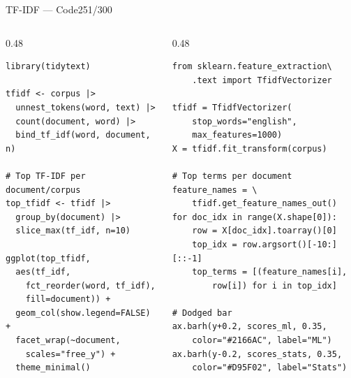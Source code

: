 \documentclass[10pt]{beamer}
\newcommand{\smark}[1]{\hfill{\scriptsize\color{codegray}#1}}
\begin{document}
\begin{frame}[fragile]{TF-IDF --- Code}\smark{251/300}
\begin{columns}[T]
\begin{column}{0.48\textwidth}
\begin{lstlisting}[style=Rstyle]
library(tidytext)

tfidf <- corpus |>
  unnest_tokens(word, text) |>
  count(document, word) |>
  bind_tf_idf(word, document, n)

# Top TF-IDF per document/corpus
top_tfidf <- tfidf |>
  group_by(document) |>
  slice_max(tf_idf, n=10)

ggplot(top_tfidf,
  aes(tf_idf,
    fct_reorder(word, tf_idf),
    fill=document)) +
  geom_col(show.legend=FALSE) +
  facet_wrap(~document,
    scales="free_y") +
  theme_minimal()
\end{lstlisting}
\end{column}
\begin{column}{0.48\textwidth}
\begin{lstlisting}[style=Pystyle]
from sklearn.feature_extraction\
    .text import TfidfVectorizer

tfidf = TfidfVectorizer(
    stop_words="english",
    max_features=1000)
X = tfidf.fit_transform(corpus)

# Top terms per document
feature_names = \
    tfidf.get_feature_names_out()
for doc_idx in range(X.shape[0]):
    row = X[doc_idx].toarray()[0]
    top_idx = row.argsort()[-10:][::-1]
    top_terms = [(feature_names[i],
        row[i]) for i in top_idx]

# Dodged bar
ax.barh(y+0.2, scores_ml, 0.35,
    color="#2166AC", label="ML")
ax.barh(y-0.2, scores_stats, 0.35,
    color="#D95F02", label="Stats")
\end{lstlisting}
\end{column}
\end{columns}
\end{frame}
\end{document}
